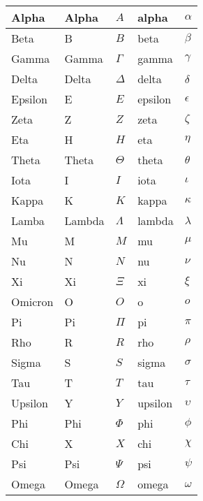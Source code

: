         \begin{tabular}{|| l || l | l || l | l ||}
            \hline
            Alpha & Alpha & $A$      & alpha & $\alpha$ \\
            \hline
            Beta & B & $B$     & beta & $\beta$ \\
            \hline
            Gamma & Gamma & $\Gamma$     & gamma & $\gamma$ \\
            \hline
            Delta & Delta & $\Delta$     & delta & $\delta$ \\
            \hline
            Epsilon & E & $E$     & epsilon & $\epsilon$ \\
            \hline
            Zeta & Z & $Z$     & zeta & $\zeta$ \\
            \hline
            Eta & H  & $H$     & eta & $\eta$ \\
            \hline
            Theta & Theta & $\Theta$    & theta & $\theta$ \\
            \hline
            Iota & I & $I$     & iota & $\iota$ \\
            \hline
            Kappa & K & $K$     &  kappa & $\kappa$ \\
            \hline
            Lamba & Lambda & $\Lambda$    & lambda & $\lambda$ \\
            \hline
            Mu  & M & $M$     & mu & $\mu$ \\
            \hline
            Nu & N & $N$     & nu & $\nu$ \\
            \hline
            Xi & Xi & $\Xi$     & xi & $\xi$ \\
            \hline
            Omicron & O & $O$    & o & $o$ \\
            \hline
            Pi & Pi & $\Pi$     & pi & $\pi$ \\
            \hline
            Rho & R & $R$    & rho & $\rho$ \\
            \hline
            Sigma & S & $S$    & sigma & $\sigma$ \\
            \hline
            Tau & T & $T$    & tau & $\tau$ \\
            \hline
            Upsilon & Y & $Y$    & upsilon & $\upsilon$ \\
            \hline
            Phi & Phi & $\Phi$     & phi & $\phi$ \\
            \hline
            Chi & X & $X$     & chi & $\chi$ \\
            \hline
            Psi & Psi & $\Psi$     & psi & $\psi$ \\
            \hline
            Omega & Omega & $\Omega$    & omega & $\omega$ \\
            \hline
        \end{tabular}

